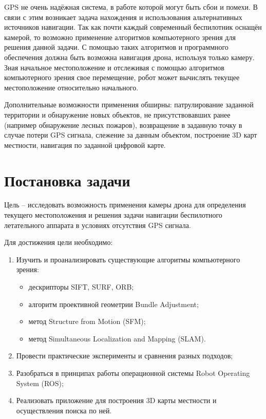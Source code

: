 GPS не очень надёжная система, в работе которой могут быть сбои и помехи. В связи с этим возникает задача нахождения и использования альтернативных источников навигации. Так как почти каждый современный беспилотник оснащён камерой, то возможно применение алгоритмов компьютерного зрения для решения данной задачи. С помощью таких алгоритмов и программного обеспечения должна быть возможна навигация дрона, используя только камеру. Зная начальное местоположение и отслеживая с помощью алгоритмов компьютерного зрения свое перемещение, робот может вычислять текущее местоположение относительно начального.

Дополнительные возможности применения обширны: патрулирование заданной территории и обнаружение новых объектов, не присутствовавших ранее (например обнаружение лесных пожаров), возвращение в заданную точку в случае потери GPS сигнала, слежение за данным объектом, построение 3D карт местности, навигация по заданной цифровой карте.

\section{Постановка задачи}

Цель -- исследовать возможность применения камеры дрона для определения текущего местоположения и решения задачи навигации беспилотного летательного аппарата в условиях отсутствия GPS сигнала.

Для достижения цели необходимо:
\begin{enumerate}
    \item Изучить и проанализировать существующие алгоритмы компьютерного зрения:
        \begin{itemize}
            \item дескрипторы SIFT, SURF, ORB;
            \item алгоритм проективной геометрии Bundle Adjustment;
            \item метод Structure from Motion (SFM);
            \item метод Simultaneous Localization and Mapping (SLAM).
        \end{itemize}
    \item Провести практические эксперименты и сравнения разных подходов;
    \item Разобраться в принципах работы операционной системы Robot Operating System (ROS);
    \item Реализовать приложение для построения 3D карты местности и осуществления поиска по ней.
\end{enumerate}
